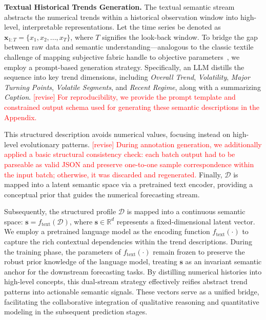 \documentclass[Afour,sageh,times]{sagej}
\newcommand{\zhang}[1]{\textcolor{red}{[revise] #1}}
\begin{document}
{\textbf{Textual Historical Trends Generation.} 
The textual semantic stream abstracts the numerical trends within a historical observation window into high-level, interpretable representations.
Let the time series be denoted as $\mathbf{x}_{1:T}=\{x_1, x_2,...,x_T\}$, where $T$ signifies the look-back window. 
To bridge the gap between raw data and semantic understanding—analogous to the classic textile challenge of mapping subjective fabric handle to objective parameters~\cite{ismail2020ai}, we employ a prompt-based generation strategy.
Specifically, an LLM distills the sequence into key trend dimensions, including \textit{Overall Trend}, \textit{Volatility}, \textit{Major Turning Points}, \textit{Volatile Segments}, and \textit{Recent Regime}, along with a summarizing \textit{Caption}.  
\zhang{For reproducibility, we provide the prompt template and constrained output schema used for generating these semantic descriptions in the Appendix.}

This structured description avoids numerical values, focusing instead on high-level evolutionary patterns. \zhang{During annotation generation, we additionally applied a basic structural consistency check: each batch output had to be parseable as valid JSON and preserve one-to-one sample correspondence within the input batch; otherwise, it was discarded and regenerated.}
Finally, $\mathcal{D}$ is mapped into a latent semantic space via a pretrained text encoder, providing a conceptual prior that guides the numerical forecasting stream.

Subsequently, the structured profile $\mathcal{D}$ is mapped into a continuous semantic space: $\mathbf{s} = f_{\text{text}}(\mathcal{D})$, where $\mathbf{s} \in \mathbb{R}^d$ represents a fixed-dimensional latent vector. We employ a pretrained language model as the encoding function $f_{\text{text}}(\cdot)$ to capture the rich contextual dependencies within the trend descriptions. During the training phase, the parameters of $f_{\text{text}}(\cdot)$ remain frozen to preserve the robust prior knowledge of the language model, treating $\mathbf{s}$ as an invariant semantic anchor for the downstream forecasting tasks. By distilling numerical histories into high-level concepts, this dual-stream strategy effectively reifies abstract trend patterns into actionable semantic signals. These vectors serve as a unified bridge, facilitating the collaborative integration of qualitative reasoning and quantitative modeling in the subsequent prediction stages.

}
\end{document}
